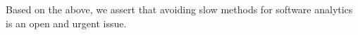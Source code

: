 \documentclass[sigconf,review, anonymous]{acmart}
\theoremstyle{break}
\newcommand{\bi}{\begin{itemize}[leftmargin=0.4cm]}
\newcommand{\ei}{\end{itemize}}
\begin{document}
Based on the above, we assert that 
avoiding slow methods for software analytics is an 
open and urgent issue.
\end{document}
